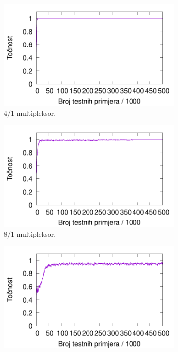 \documentclass[times, utf8, zavrsni]{fer}
\begin{document}
\begin{figure}[!h]
    \centering
    \begin{subfigure}{0.496\textwidth}
        \centering
        \includegraphics[width=\textwidth]{img/multiplexer/6muxnre.pdf}
        \caption{4/1 multipleksor.}
        \label{fig:6muxnre}
    \end{subfigure}
    \begin{subfigure}{0.496\textwidth}
        \centering
        \includegraphics[width=\textwidth]{img/multiplexer/11muxnre.pdf}
        \caption{8/1 multipleksor.}
        \label{fig:11muxnre}
    \end{subfigure}
    \begin{subfigure}{0.496\textwidth}
        \centering
        \includegraphics[width=\textwidth]{img/multiplexer/20muxnre.pdf}

\end{subfigure}
\end{figure}
\end{document}
